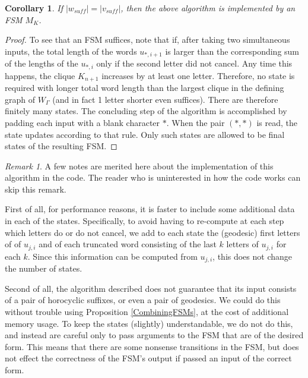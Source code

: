\documentclass{amsart}
\newtheorem{corollary}[theorem]{Corollary}
\theoremstyle{definition}
\theoremstyle{remark}
\newtheorem{remark}[theorem]{Remark}
\begin{document}
	\begin{corollary} \label{DivergenceGraphEqualLengthEdgeFSM}
		If $|w_{suff}|=|v_{suff}|$, then the above algorithm is implemented by an FSM $M_{K}$.
	\end{corollary}
	
	\begin{proof}
		To see that an FSM suffices, note that if, after taking two simultaneous inputs, the total length of the words $u_{*, i+1}$ is larger than the corresponding sum of the lengths of the $u_{*, i}$ only if the second letter did not cancel. Any time this happens, the clique $K_{n+1}$ increases by at least one letter. Therefore, no state is required with longer total word length than the largest clique in the defining graph of $W_\Gamma$ (and in fact 1 letter shorter even suffices). There are therefore finitely many states. The concluding step of the algorithm is accomplished by padding each input with a blank character $*$. When the pair $(*, *)$ is read, the state updates according to that rule. Only such states are allowed to be final states of the resulting FSM.
	\end{proof}
	
	\begin{remark}
		
		A few notes are merited here about the implementation of this algorithm in the code. The reader who is uninterested in how the code works can skip this remark.
		
		First of all, for performance reasons, it is faster to include some additional data in each of the states. Specifically, to avoid having to re-compute at each step which letters do or do not cancel, we add to each state the (geodesic) first letters of of $u_{j,i}$ and of each truncated word consisting of the last $k$ letters of $u_{j,i}$ for each $k$. Since this information can be computed from $u_{j,i}$, this does not change the number of states.
		
		Second of all, the algorithm described does not guarantee that its input consists of a pair of horocyclic suffixes, or even a pair of geodesics. We could do this without trouble using Proposition \ref{CombiningFSMs}, at the cost of additional memory usage. To keep the states (slightly) understandable, we do not do this, and instead are careful only to pass arguments to the FSM that are of the desired form. This means that there are some nonsense transitions in the FSM, but does not effect the correctness of the FSM's output if passed an input of the correct form.
		
	\end{remark}
	
\end{document}
